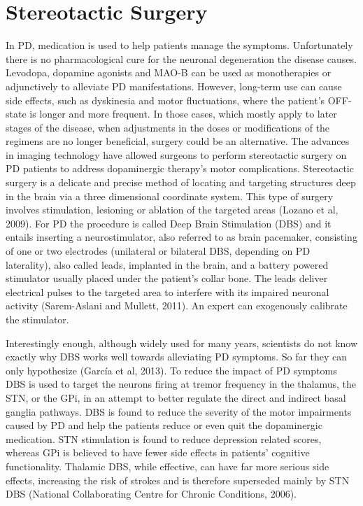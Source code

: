 
\section{Stereotactic Surgery}
\label{sec:surgery}
In PD, medication is used to help patients manage the symptoms. Unfortunately there is no pharmacological cure for the neuronal degeneration the disease causes. Levodopa, dopamine agonists and MAO-B can be used as monotherapies or adjunctively to alleviate PD manifestations. However, long-term use can cause side effects, such as dyskinesia and motor fluctuations, where the patient's OFF-state is longer and more frequent. In those cases, which mostly apply to later stages of the disease, when adjustments in the doses or modifications of the regimens are no longer beneficial, surgery could be an alternative. The advances in imaging technology have allowed surgeons to perform stereotactic surgery on PD patients to address dopaminergic therapy's motor complications. Stereotactic surgery is a delicate and precise method of locating and targeting structures deep in the brain via a three dimensional coordinate system. This type of surgery involves stimulation, lesioning or ablation of the targeted areas (Lozano et al, 2009). For PD the procedure is called Deep Brain Stimulation (DBS) and it entails inserting a neurostimulator, also referred to as brain pacemaker, consisting of one or two electrodes (unilateral or bilateral DBS, depending on PD laterality), also called leads, implanted in the brain, and a battery powered stimulator usually placed under the patient's collar bone. The leads deliver electrical pulses to the targeted area to interfere with its impaired neuronal activity (Sarem-Aslani and Mullett, 2011). An expert can exogenously calibrate the stimulator.
 
Interestingly enough, although widely used for many years, scientists do not know exactly why DBS works well towards alleviating PD symptoms. So far they can only hypothesize (García et al, 2013). To reduce the impact of PD symptoms DBS is used to target the neurons firing at tremor frequency in the thalamus, the STN, or the GPi, in an attempt to better regulate the direct and indirect basal ganglia pathways. DBS is found to reduce the severity of the motor impairments caused by PD and help the patients reduce or even quit the dopaminergic medication. STN stimulation is found to reduce depression related scores, whereas GPi is believed to have fewer side effects in patients' cognitive functionality. Thalamic DBS, while effective, can have far more serious side effects, increasing the risk of strokes and is therefore superseded mainly by STN DBS (National Collaborating Centre for Chronic Conditions, 2006). 